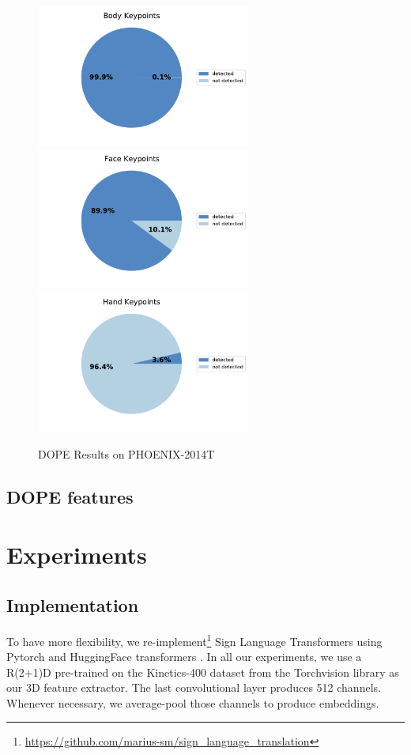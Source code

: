 \documentclass[final]{cvpr}
\begin{document}
\begin{figure}[h]
		\centering
		\includegraphics[width=7cm]{fig/body.pdf}
		\includegraphics[width=7cm]{fig/face.pdf}
		\includegraphics[width=7cm]{fig/hand.pdf}
	\caption{DOPE Results on  PHOENIX-2014T}
	\label{fig:pie_charts}
\end{figure}


\subsection{DOPE features}

\section{Experiments}
\subsection{Implementation}

To have more flexibility, we re-implement\footnote{\url{https://github.com/marius-sm/sign_language_translation}} Sign Language Transformers \cite{neccam} using Pytorch and HuggingFace transformers \cite{huggingface}. In all our experiments, we use a R(2+1)D \cite{r2plus1} pre-trained on the Kinetics-400 \cite{kinetics} dataset from the Torchvision library as our 3D feature extractor. The last convolutional layer produces 512 channels. Whenever necessary, we average-pool those channels to produce embeddings.
\end{document}
